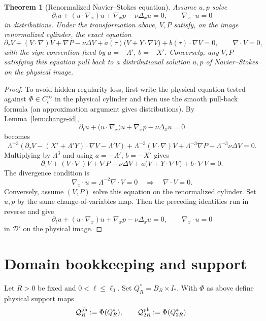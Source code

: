 \documentclass[11pt]{amsart}
\theoremstyle{plain}
\newtheorem{theorem}{Theorem}[section]
\theoremstyle{definition}
\theoremstyle{remark}
\newcommand{\nn}{\nabla}
\begin{document}
\begin{theorem}[Renormalized Navier--Stokes equation]\label{thm:ren-NS}
Assume \(u,p\) solve
\[
\partial_t u+(u\cdot\nn_x)u+\nn_x p-\nu\Delta_xu=0,\qquad \nn_x\cdot u=0
\]
in distributions. Under the transformation above, \(V,P\) satisfy, on the image
renormalized cylinder, the exact equation
\[
\partial_\tau V+(V\cdot\nn)V+\nn P-\nu\Delta V
+a(\tau)\bigl(V+Y\cdot\nn V\bigr)+b(\tau)\cdot\nn V=0,\qquad \nn\cdot V=0,
\]
with the sign convention fixed by \(a=-\Lambda'\), \(b=-X'\).
Conversely, any \(V,P\) satisfying this equation pull back to a distributional
solution \(u,p\) of Navier--Stokes on the physical image.
\end{theorem}
\begin{proof}
To avoid hidden regularity loss, first write the physical equation tested against
\(\Phi\in C_c^\infty\) in the physical cylinder and then use the smooth pull-back formula
(an approximation argument gives distributions). By Lemma~\ref{lem:change-id},
\[
\partial_tu+\bigl(u\cdot\nabla_x\bigr)u+\nabla_xp-\nu\Delta_xu=0
\]
becomes
\[
\Lambda^{-3}\!\left(\partial_\tau V-(X'+\Lambda'Y)\cdot\nabla V-\Lambda'V\right)
+\Lambda^{-3}(V\cdot\nabla)V
+\Lambda^{-3}\nabla P
-\Lambda^{-3}\nu\Delta V=0.
\]
Multiplying by \(\Lambda^3\) and using \(a=-\Lambda'\), \(b=-X'\) gives
\[
\partial_\tau V+(V\cdot\nabla)V+\nabla P-\nu\Delta V
+a\bigl(V+Y\cdot\nabla V\bigr)+b\cdot\nabla V=0.
\]
The divergence condition is
\[
\nabla_x\cdot u=\Lambda^{-2}\nabla\cdot V=0
\quad\Longrightarrow\quad
\nabla\cdot V=0.
\]
Conversely, assume \((V,P)\) solve this equation on the renormalized cylinder.
Set \(u,p\) by the same change-of-variables map.
Then the preceding identities run in reverse and give
 \[
\partial_t u+(u\cdot\nabla_x)u+\nabla_xp-\nu\Delta_xu=0,\qquad
\nabla_x\cdot u=0
\]
in \(\mathcal D'\) on the physical image.
\end{proof}

\section{Domain bookkeeping and support}\label{sec:domains}

Let \(R>0\) be fixed and \(0<\ell\le \ell_0\). Set \(Q_R^*=B_R\times I_*\).
With \(\Phi\) as above define physical support maps
\[
\mathcal Q^{\rm ph}_{R}:=\Phi(Q_R^*),\qquad
\mathcal Q^{\rm ph}_{2R}:=\Phi(Q_{2R}^*).
\]
\end{document}
